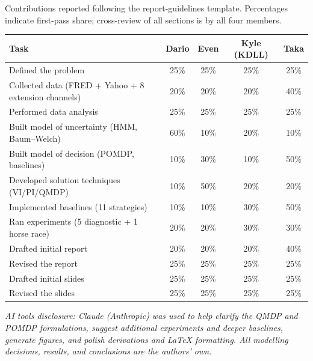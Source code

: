 \documentclass[11pt]{article}
\theoremstyle{plain1}
\theoremstyle{definition1}
\newcommand{\1}{\mathbf{1}}
\begin{document}
\noindent\small Contributions reported following the report-guidelines template. Percentages indicate first-pass share; cross-review of all sections is by all four members.

\begin{center}
\begin{tabular}{lcccc}
\toprule
Task & Dario & Even & Kyle (KDLL) & Taka \\
\midrule
Defined the problem                              & 25\% & 25\% & 25\% & 25\% \\
Collected data (FRED + Yahoo + 8 extension channels) & 20\% & 20\% & 20\% & 40\% \\
Performed data analysis                          & 25\% & 25\% & 25\% & 25\% \\
Built model of uncertainty (HMM, Baum--Welch)    & 60\% & 10\% & 20\% & 10\% \\
Built model of decision (POMDP, baselines)       & 10\% & 30\% & 10\% & 50\% \\
Developed solution techniques (VI/PI/QMDP)       & 10\% & 50\% & 20\% & 20\% \\
Implemented baselines (11 strategies)            & 10\% & 10\% & 30\% & 50\% \\
Ran experiments (5 diagnostic + 1 horse race)    & 20\% & 20\% & 30\% & 30\% \\
Drafted initial report                           & 20\% & 20\% & 20\% & 40\% \\
Revised the report                               & 25\% & 25\% & 25\% & 25\% \\
Drafted initial slides                           & 25\% & 25\% & 25\% & 25\% \\
Revised the slides                               & 25\% & 25\% & 25\% & 25\% \\
\bottomrule
\end{tabular}
\end{center}

\bigskip
\noindent\footnotesize\textit{AI tools disclosure: Claude (Anthropic) was used to help clarify the QMDP and POMDP formulations, suggest additional experiments and deeper baselines, generate figures, and polish derivations and \LaTeX{} formatting. All modelling decisions, results, and conclusions are the authors' own.}
\end{document}
